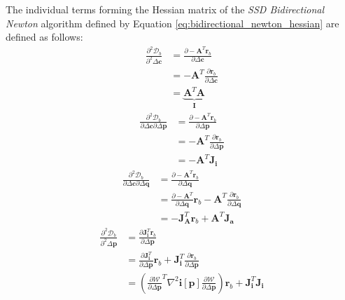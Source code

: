 The individual terms forming the Hessian matrix of the \emph{SSD Bidirectional Newton} algorithm defined by Equation \ref{eq:bidirectional_newton_hessian} are defined as follows:
\begin{equation}
    \begin{aligned}
		\frac{\partial^2 \mathcal{D}_b}{\partial^2 \Delta \mathbf{c}} & = \frac{\partial -\mathbf{A}^T \mathbf{r}_b}{\partial \Delta \mathbf{c}}
		\\
		& = -\mathbf{A}^T \frac{\partial \mathbf{r}_b}{\partial \Delta \mathbf{c}}
		\\
		& = \underbrace{\mathbf{A}^T \mathbf{A}}_{\mathbf{I}}
    \label{eq:bidirectional_hessian_term1}
    \end{aligned}
\end{equation}
\begin{equation}
    \begin{aligned}
		\frac{\partial^2 \mathcal{D}_b}{\partial \Delta \mathbf{c} \partial \Delta \mathbf{p}} & = \frac{\partial -\mathbf{A}^T \mathbf{r}_b}{\partial \Delta \mathbf{p}}
		\\
		& = -\mathbf{A}^T \frac{\partial \mathbf{r}_b}{\partial \Delta \mathbf{p}}
		\\
		& = -\mathbf{A}^T \mathbf{J}_{\mathbf{i}}
    \label{eq:bidirectional_hessian_term2}
    \end{aligned}
\end{equation}
\begin{equation}
    \begin{aligned}
		\frac{\partial^2 \mathcal{D}_b}{\partial \Delta \mathbf{c} \partial \Delta \mathbf{q}} & =  \frac{\partial -\mathbf{A}^T \mathbf{r}_b}{\partial \Delta \mathbf{q}}
		\\
		&= \frac{\partial -\mathbf{A}^T}{\partial \Delta \mathbf{q}} \mathbf{r}_b - \mathbf{A}^T \frac{\partial \mathbf{r}_b}{\partial \Delta \mathbf{q}}
		\\
		& = -\mathbf{J}_{\mathbf{A}}^T \mathbf{r}_b + \mathbf{A}^T \mathbf{J}_{\mathbf{a}}
    \label{eq:bidirectional_hessian_term3}
    \end{aligned}
\end{equation}
\begin{equation}
    \begin{aligned}
		\frac{\partial^2 \mathcal{D}_b}{\partial^2 \Delta \mathbf{p}} & =  \frac{\partial \mathbf{J}_{\mathbf{i}}^T \mathbf{r}_b}{\partial \Delta \mathbf{p}}
		\\
		& = \frac{\partial \mathbf{J}_{\mathbf{i}}^T}{\partial \Delta \mathbf{p}} \mathbf{r}_b + \mathbf{J}_{\mathbf{i}}^T \frac{\partial \mathbf{r}_b}{\partial \Delta \mathbf{p}}
		\\
		& = \left( \frac{\partial\mathcal{W}}{\partial \Delta \mathbf{p}}^T \nabla^2 \mathbf{i}[\mathbf{p}] \frac{\partial\mathcal{W}}{\partial \Delta \mathbf{p}} \right) \mathbf{r}_b + \mathbf{J}_{\mathbf{i}}^T \mathbf{J}_{\mathbf{i}}
    \label{q:bidirectional_hessian_term4}
    \end{aligned}
\end{equation}
